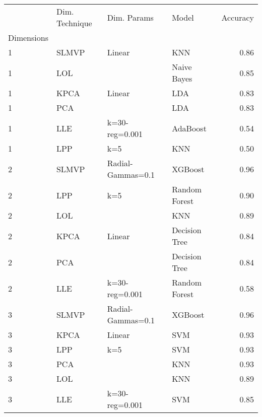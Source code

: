\begin{table}
    \begin{tabular}{llllr}
        \toprule
        {}         & Dim. Technique & Dim. Params        & Model         & Accuracy \\
        Dimensions &                &                    &               &          \\
        \midrule
        1          & SLMVP          & Linear             & KNN           & 0.86     \\
        1          & LOL            &                    & Naive Bayes   & 0.85     \\
        1          & KPCA           & Linear             & LDA           & 0.83     \\
        1          & PCA            &                    & LDA           & 0.83     \\
        1          & LLE            & k=30-reg=0.001     & AdaBoost      & 0.54     \\
        1          & LPP            & k=5                & KNN           & 0.50     \\
        2          & SLMVP          & Radial-Gammas=0.1  & XGBoost       & 0.96     \\
        2          & LPP            & k=5                & Random Forest & 0.90     \\
        2          & LOL            &                    & KNN           & 0.89     \\
        2          & KPCA           & Linear             & Decision Tree & 0.84     \\
        2          & PCA            &                    & Decision Tree & 0.84     \\
        2          & LLE            & k=30-reg=0.001     & Random Forest & 0.58     \\
        3          & SLMVP          & Radial-Gammas=0.1  & XGBoost       & 0.96     \\
        3          & KPCA           & Linear             & SVM           & 0.93     \\
        3          & LPP            & k=5                & SVM           & 0.93     \\
        3          & PCA            &                    & KNN           & 0.93     \\
        3          & LOL            &                    & KNN           & 0.89     \\
        3          & LLE            & k=30-reg=0.001     & SVM           & 0.85     \\

\end{tabular}
\end{table}
